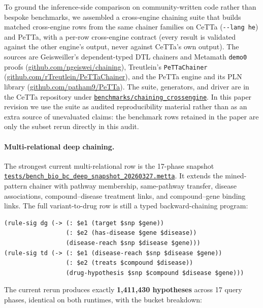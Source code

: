 \documentclass[11pt]{article}
\newcommand{\code}[1]{\texttt{#1}}
\newcommand{\PeTTa}{\textup{PeTTa}}
\newcommand{\CeTTa}{\textup{CeTTa}}
\begin{document}
To ground the inference-side comparison on community-written code
rather than bespoke benchmarks, we assembled a cross-engine chaining
suite that builds matched cross-engine rows from the same chainer
families on \CeTTa{} (\code{-{}-lang he}) and \PeTTa{}, with a per-row
cross-engine contract (every result is
validated against the other engine's output, never against \CeTTa{}'s
own output).  The sources are
Geisweiller's dependent-typed DTL chainers and Metamath \code{demo0}
proofs (\href{https://github.com/ngeiswei/chaining}{github.com/ngeiswei/chaining}),
Treutlein's \code{PeTTaChainer}
(\href{https://github.com/rTreutlein/PeTTaChainer}{github.com/rTreutlein/PeTTaChainer}),
and the \PeTTa{} engine and its PLN library
(\href{https://github.com/patham9/PeTTa}{github.com/patham9/PeTTa}).
The suite, generators, and driver are in the \CeTTa{} repository under
\href{https://github.com/zariuq/CeTTa/tree/07928677c0237a19b2f3c32dffca28d7d2626723/benchmarks/chaining_crossengine}{\code{benchmarks/chaining\_crossengine}}.
In this paper revision we use the suite as audited reproducibility
material rather than as an extra source of unevaluated claims: the
benchmark rows retained in the paper are only the subset rerun directly
in this audit.

\paragraph{Multi-relational deep chaining.}
The strongest current multi-relational row is the 17-phase snapshot
\href{https://github.com/zariuq/CeTTa/blob/07928677c0237a19b2f3c32dffca28d7d2626723/tests/bench_bio_bc_deep_snapshot_20260327.metta}{\code{tests/bench\_bio\_bc\_deep\_snapshot\_20260327.metta}}.
It extends the mined-pattern chainer with pathway membership,
same-pathway transfer, disease associations, compound--disease
treatment links, and compound--gene binding links.  The full
variant-to-drug row is still a typed backward-chaining program:
\begin{lstlisting}[language={},basicstyle=\ttfamily\scriptsize]
(rule-sig dg (-> (: $e1 (target $snp $gene))
                 (: $e2 (has-disease $gene $disease))
                 (disease-reach $snp $disease $gene)))
(rule-sig td (-> (: $e1 (disease-reach $snp $disease $gene))
                 (: $e2 (treats $compound $disease))
                 (drug-hypothesis $snp $compound $disease $gene)))
\end{lstlisting}
The current rerun produces exactly \textbf{1{,}411{,}430 hypotheses}
across 17 query phases, identical on both runtimes, with the bucket
breakdown:
\end{document}
